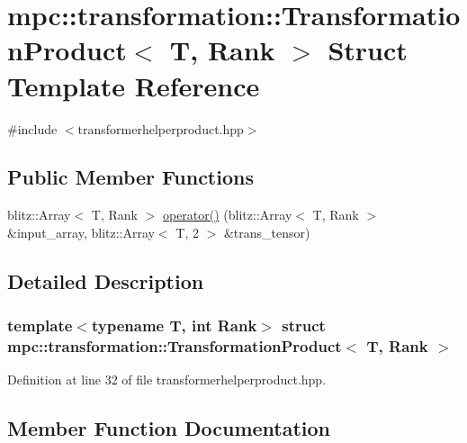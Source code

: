 \hypertarget{structmpc_1_1transformation_1_1_transformation_product}{}\section{mpc\+:\+:transformation\+:\+:Transformation\+Product$<$ T, Rank $>$ Struct Template Reference}
\label{structmpc_1_1transformation_1_1_transformation_product}


{\ttfamily \#include $<$transformerhelperproduct.\+hpp$>$}

\subsection*{Public Member Functions}
\begin{DoxyCompactItemize}
\item 
blitz\+::\+Array$<$ T, Rank $>$ \mbox{\hyperlink{structmpc_1_1transformation_1_1_transformation_product_a51a570894b9a6fe0318ba3e3d7b21766}{operator()}} (blitz\+::\+Array$<$ T, Rank $>$ \&input\+\_\+array, blitz\+::\+Array$<$ T, 2 $>$ \&trans\+\_\+tensor)
\end{DoxyCompactItemize}


\subsection{Detailed Description}
\subsubsection*{template$<$typename T, int Rank$>$\newline
struct mpc\+::transformation\+::\+Transformation\+Product$<$ T, Rank $>$}



Definition at line 32 of file transformerhelperproduct.\+hpp.



\subsection{Member Function Documentation}
\mbox{\label{structmpc_1_1transformation_1_1_transformation_product_a51a570894b9a6fe0318ba3e3d7b21766}} 
